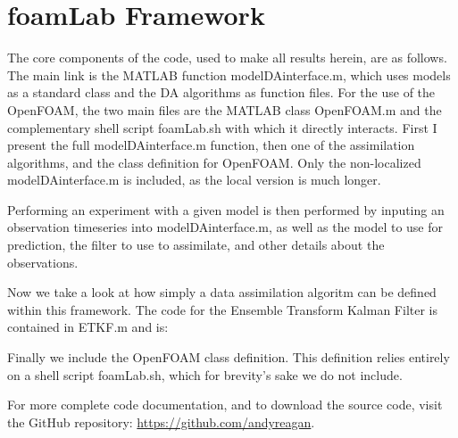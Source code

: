 \documentclass[12pt]{report}
\begin{document}
\chapter{foamLab Framework}
\label{app:foamlab}

The core components of the code, used to make all results herein, are as follows.
The main link is the MATLAB function modelDAinterface.m, which uses models as a standard class and the DA algorithms as function files.
For the use of the OpenFOAM, the two main files are the MATLAB class OpenFOAM.m and the complementary shell script foamLab.sh with which it directly interacts.
First I present the full modelDAinterface.m function, then one of the assimilation algorithms, and the class definition for OpenFOAM.
Only the non-localized modelDAinterface.m is included, as the local version is much longer.

Performing an experiment with a given model is then performed by inputing an observation timeseries into modelDAinterface.m, as well as the model to use for prediction, the filter to use to assimilate, and other details about the observations.

{\scriptsize }

Now we take a look at how simply a data assimilation algoritm can be defined within this framework.
The code for the Ensemble Transform Kalman Filter is contained in ETKF.m and is:

{\scriptsize }

Finally we include the OpenFOAM class definition.
This definition relies entirely on a shell script foamLab.sh, which for brevity's sake we do not include.

{\scriptsize }

For more complete code documentation, and to download the source code, visit the GitHub repository: \url{https://github.com/andyreagan}.
\end{document}
